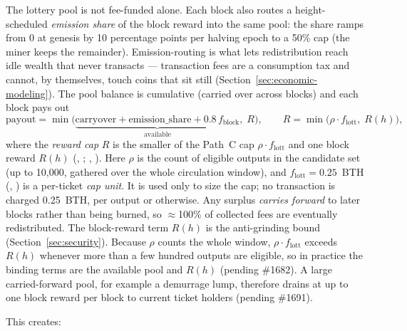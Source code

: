 The lottery pool is not fee-funded alone. Each block also routes a
height-scheduled \emph{emission share} of the block reward into the same
pool: the share ramps from 0 at genesis by 10 percentage points per halving
epoch to a 50\% cap (the miner keeps the remainder). Emission-routing is what
lets redistribution reach idle wealth that never transacts --- transaction
fees are a consumption tax and cannot, by themselves, touch coins that sit
still (Section~\ref{sec:economic-modeling}). The pool balance is cumulative
(carried over across blocks) and each block pays out
\begin{equation}
\text{payout} = \min\!\big(\underbrace{\text{carryover} + \text{emission\_share} + 0.8\,f_{\text{block}}}_{\text{available}},\; R\big),
\qquad
R = \min\!\big(\rho \cdot f_{\text{lott}},\; R(h)\big),
\end{equation}
where the \emph{reward cap} $R$ is the smaller of the Path~C cap
$\rho \cdot f_{\text{lott}}$ and one block reward $R(h)$
(, ;
, ). Here $\rho$ is
the count of eligible outputs in the candidate set (up to 10{,}000, gathered
over the whole circulation window), and $f_{\text{lott}} = 0.25$~BTH
(, ) is
a per-ticket \emph{cap unit}. It is used only to size the cap; no transaction
is charged 0.25~BTH, per output or otherwise. Any surplus \emph{carries
forward} to later blocks rather than being burned, so $\approx$100\% of
collected fees are eventually redistributed. The block-reward term $R(h)$ is
the anti-grinding bound (Section~\ref{sec:security}). Because $\rho$ counts
the whole window, $\rho \cdot f_{\text{lott}}$ exceeds $R(h)$ whenever more
than a few hundred outputs are eligible, so in practice the binding terms are
the available pool and $R(h)$ (pending \#1682). A large carried-forward pool,
for example a demurrage lump, therefore drains at up to one block reward per
block to current ticket holders (pending \#1691).

This creates:

